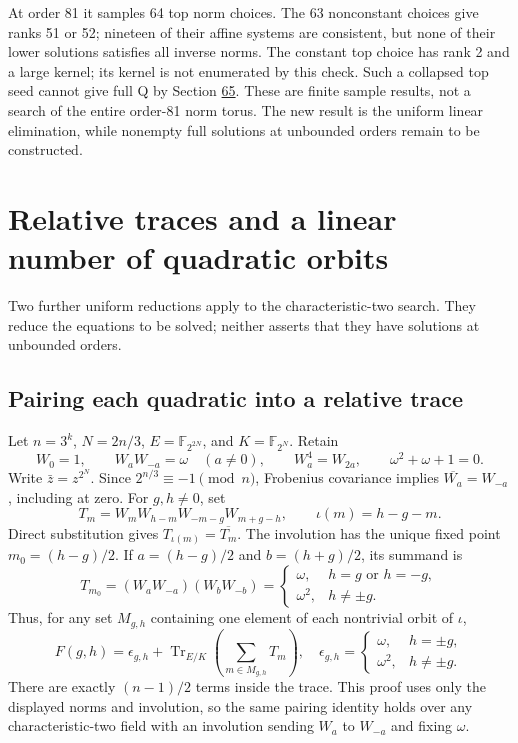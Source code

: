 \documentclass[11pt,reqno]{amsart}
\theoremstyle{plain}
\begin{document}
At order 81 it samples 64 top norm choices. The 63 nonconstant choices
give ranks 51 or 52; nineteen of their affine systems are consistent,
but none of their lower solutions satisfies all inverse norms. The
constant top choice has rank 2 and a large kernel; its kernel is not
enumerated by this check. Such a collapsed top seed cannot give full
Q by Section \hyperref[sec:65]{65}. These are finite sample results, not a search of the
entire order-81 norm torus. The new result is the uniform linear
elimination, while nonempty full solutions at unbounded orders remain
to be constructed.

\section{Relative traces and a linear number of quadratic orbits}\label{sec:69}

Two further uniform reductions apply to the characteristic-two search.
They reduce the equations to be solved; neither asserts that they have
solutions at unbounded orders.

\subsection{Pairing each quadratic into a relative trace}\label{sec:69.1}

Let \(n=3^k\), \(N=2n/3\), \(E=\mathbb F_{2^{2N}}\), and
\(K=\mathbb F_{2^N}\). Retain
\[
 W_0=1,\qquad W_aW_{-a}=\omega\quad(a\ne0),\qquad
 W_a^4=W_{2a},\qquad \omega^2+\omega+1=0.
\]
Write \(\bar z=z^{2^N}\). Since \(2^{n/3}\equiv-1\pmod n\),
Frobenius covariance implies \(\overline{W_a}=W_{-a}\), including
at zero. For \(g,h\ne0\), set
\[
 T_m=W_mW_{h-m}W_{-m-g}W_{m+g-h},\qquad
 \iota(m)=h-g-m.
\]
Direct substitution gives \(T_{\iota(m)}=\overline{T_m}\).
The involution has the unique fixed point \(m_0=(h-g)/2\).
If \(a=(h-g)/2\) and \(b=(h+g)/2\), its summand is
\[
 T_{m_0}=(W_aW_{-a})(W_bW_{-b})
 =\begin{cases}\omega,&h=g\text{ or }h=-g,\\
                 \omega^2,&h\ne\pm g.
   \end{cases}
\]
Thus, for any set \(M_{g,h}\) containing one element of each
nontrivial orbit of \(\iota\),
\begin{equation*}
 \boxed{\displaystyle
 F(g,h)=\epsilon_{g,h}
  +\operatorname{Tr}_{E/K}\!\left(\sum_{m\in M_{g,h}}T_m\right),
 \quad
 \epsilon_{g,h}=\begin{cases}\omega,&h=\pm g,\\
                              \omega^2,&h\ne\pm g.
              \end{cases}}
 \tag{69.1}
\end{equation*}
There are exactly \((n-1)/2\) terms inside the trace. This proof
uses only the displayed norms and involution, so the same pairing
identity holds over any characteristic-two field with an involution
sending \(W_a\) to \(W_{-a}\) and fixing \(\omega\).
\end{document}
